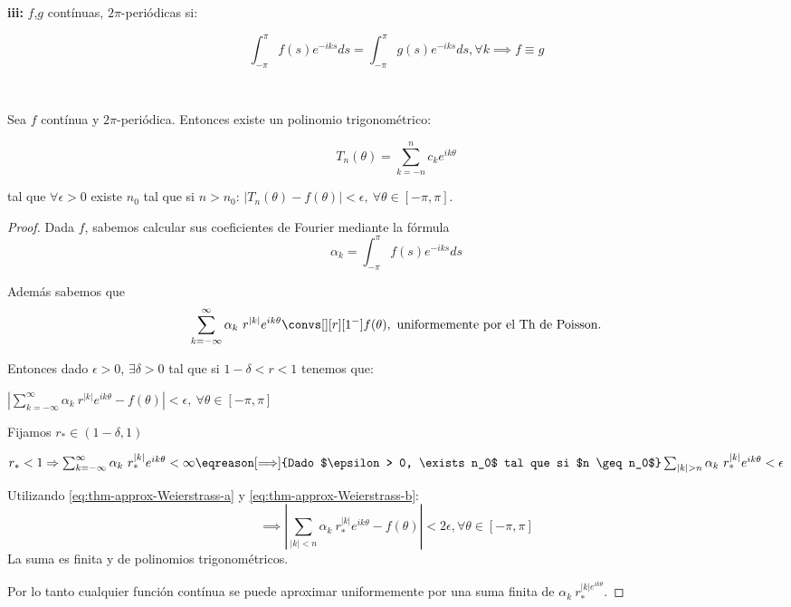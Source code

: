 		\textbf{iii:} $f$,$g$ contínuas, $2\pi$-periódicas si:

		\[ \int_{-\pi}^{\pi} f(s) e^{-iks}ds =
		 \int_{-\pi}^{\pi} g(s) e^{-iks}ds,  \forall k \implies f \equiv g \]

		\begin{theorem} \label{thm:AproxWeierstrass1}
		$ $ %

		Sea $f$ contínua y $2\pi$-periódica. Entonces existe un polinomio trigonométrico:

		\[T_n (\theta) = \sum_{k = -n}^n c_k e^{ik\theta} \]

		tal que $\forall \epsilon > 0$ existe $n_0$ tal que si $n > n_0$: $|T_n (\theta) - f(\theta)| < \epsilon, \ \forall \theta \in [-\pi,\pi]$.
		\end{theorem}

		\begin{proof}
			Dada $f$, sabemos calcular sus coeficientes de Fourier mediante la fórmula
			\[ \alpha_k = \int_{-\pi}^\pi f(s) e^{-iks} ds \]

			Además sabemos que
			\[ \sum_{k=-\infty}^{\infty} \alpha_k\  r^{|k|} e^{ik\theta} \convs[][r][1^-] f(\theta), \text{ uniformemente por el Th de Poisson.} \]

			Entonces dado $\epsilon > 0$, $\exists \delta > 0$ tal que si $1-\delta < r < 1$ tenemos que:

			\( \left| \sum_{k=-\infty}^{\infty} \alpha_k\  r^{|k|} e^{ik\theta} - f(\theta) \right| < \epsilon, \ \forall \theta \in [-\pi,\pi]  \label{eq:thm-approx-Weierstrass-a} \)

			Fijamos $r_{*} \in (1-\delta, 1)$

			\( r_* < 1 \Rightarrow \sum_{k=-\infty}^\infty \alpha_k\  r_*^{|k|} e^{ik\theta} < \infty \eqreason[\Longrightarrow]{Dado $\epsilon > 0, \exists n_0$ tal que si $n \geq n_0$} \sum_{|k| > n} \alpha_k\  r_*^{|k|} e^{ik\theta} < \epsilon \label{eq:thm-approx-Weierstrass-b} \)

			Utilizando \ref{eq:thm-approx-Weierstrass-a} y \ref{eq:thm-approx-Weierstrass-b}:
			\[ \implies \left| \sum_{|k| < n} \alpha_k\  r_*^{|k|} e^{ik\theta} - f(\theta) \right| < 2 \epsilon, \forall \theta \in [-\pi,\pi] \]
			\obs La suma es finita y de polinomios trigonométricos.

			Por lo tanto cualquier función contínua se puede aproximar uniformemente por una suma finita de $\alpha_k\ r_*^{|k| e^{ik\theta}}$.

		\end{proof}


